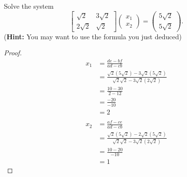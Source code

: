 \documentclass[11pt]{scrartcl}
\begin{document}
\begin{enumerate}[label=\alph*.]
{	      Solve the system
	      \begin{equation}
		      \left [ \begin{array}{cc}
				      \sqrt{2}  & 3\sqrt{2} \\
				      2\sqrt{2} & \sqrt{2}
			      \end{array} \right ] \left ( \begin{array}{c}
				      x_1 \\
				      x_2
			      \end{array} \right ) = \left ( \begin{array}{c}
				      5\sqrt{2} \\
				      5\sqrt{2}
			      \end{array} \right ).
	      \end{equation}
	      (\textbf{Hint:} You may want to use the formula you just deduced)
	      }
	      \begin{proof}
		      \begin{align*}
			      x_1 & = \frac{de-bf}{ad-cb}                                                        \\
			          & = \frac{\sqrt2(5\sqrt2) - 3\sqrt2(5\sqrt2)}{\sqrt2\sqrt2 - 3\sqrt2(2\sqrt2)} \\
			          & = \frac{10 - 30}{2-12}                                                       \\
			          & = \frac{-20}{-10}                                                            \\
			          & = 2                                                                          \\
			          &                                                                              \\
			      x_2 & = \frac{af-ce}{ad-cb}                                                        \\
			          & = \frac{\sqrt2(5\sqrt2) - 2\sqrt2(5\sqrt2)}{\sqrt2\sqrt2 - 3\sqrt2(2\sqrt2)} \\
			          & = \frac{10-20}{-10}                                                          \\
			          & = 1
		      \end{align*}
	      \end{proof}
\end{enumerate}

\end{document}
